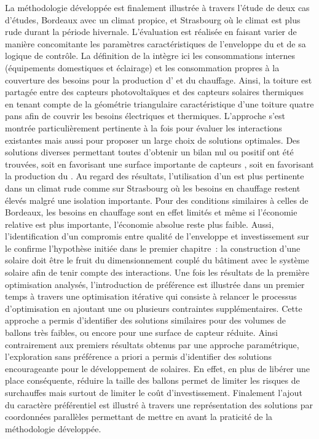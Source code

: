 La méthodologie développée est finalement illustrée à travers l’étude de deux cas
d’études, Bordeaux avec un climat propice, et Strasbourg où le climat est plus rude durant
la période hivernale. L’évaluation est réalisée en faisant varier de manière concomitante
les paramètres caractéristiques de l’enveloppe du  et de sa logique de contrôle.
La définition de la  intègre ici les consommations internes (équipements
domestiques et éclairage) et les consommation propres à la couverture des besoins pour la
production d’ et du chauffage. Ainsi, la toiture est partagée entre des capteurs
photovoltaïques et des capteurs solaires thermiques en tenant compte de la géométrie
triangulaire caractéristique d’une toiture quatre pans afin de couvrir les besoins
électriques et thermiques.
L’approche s’est montrée particulièrement pertinente à la fois pour évaluer
les interactions existantes mais aussi pour proposer un large choix de solutions
optimales. Des solutions diverses permettant toutes d’obtenir un
bilan nul ou positif ont été trouvées, soit en favorisant une surface importante de capteurs , soit
en favorisant la production du . Au regard des résultats, l’utilisation d’un
 est plus pertinente dans un climat rude comme sur Strasbourg où les besoins en chauffage restent
élevés malgré une isolation importante. Pour des conditions
similaires à celles de Bordeaux, les besoins en chauffage sont en effet limités et même si
l’économie relative est plus importante, l’économie absolue reste plus faible. Aussi,
l’identification d’un compromis entre qualité de l’enveloppe et investissement sur le
 confirme l’hypothèse initiée dans le premier chapitre~: la
construction d’une  solaire doit être le fruit du dimensionnement couplé du
bâtiment avec le système solaire afin de tenir compte des interactions. Une fois les
résultats de la première optimisation analysés, l’introduction
de préférence est illustrée dans un premier temps à travers une optimisation itérative qui
consiste à relancer le processus d’optimisation en ajoutant une ou plusieurs contraintes
supplémentaires. Cette approche a permis d’identifier des solutions similaires pour des
volumes de ballons très faibles, ou encore pour une surface de capteur réduite. Ainsi
contrairement aux premiers résultats obtenus par une approche paramétrique, l’exploration
sans préférence a priori a permis d’identifier des solutions encourageante pour le
développement de  solaires. En effet, en plus de libérer une place conséquente,
réduire la taille des ballons permet de limiter les risques de surchauffes mais surtout de
limiter le coût d’investissement. Finalement l’ajout du caractère préférentiel est illustré à travers
une représentation des solutions par coordonnées parallèles permettant de mettre en avant
la praticité de la méthodologie développée.


